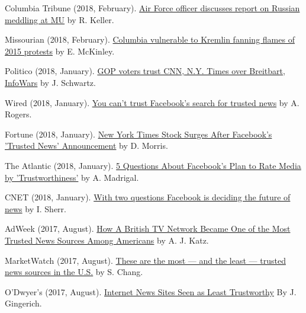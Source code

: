 \begin{bibenum}
    \item[] Columbia Tribune (2018, February).
      \href{http://www.columbiatribune.com/news/20180217/air-force-officer-discusses-report-on-russian-meddling-at-mu}{Air Force officer discusses report on Russian meddling at MU} by R. Keller.
    \item[] Missourian (2018, February).
      \href{https://www.columbiamissourian.com/news/higher_education/columbia-vulnerable-to-kremlin-fanning-flames-of-protests/article_929cf366-11ad-11e8-9631-63ac0b4a6fd3.html}{Columbia vulnerable to Kremlin fanning flames of 2015 protests} by E. McKinley.
    \item[] Politico (2018, January).
      \href{https://www.politico.com/amp/story/2018/02/06/gop-republican-voters-media-bias-trusted-sites-393650}{ GOP voters trust CNN, N.Y. Times over Breitbart, InfoWars} by J. Schwartz.
    \item[] Wired (2018, January).
      \href{https://www.wired.com/story/you-cant-trust-facebooks-search-for-trusted-news/}{You can't trust Facebook's search for trusted news} by A. Rogers.
    \item[] Fortune (2018, January).
      \href{http://fortune.com/2018/01/21/new-york-times-stock-facebooks-trusted-news/}{New York Times Stock Surges After Facebook's 'Trusted News' Announcement} by D. Morris.
    \item[] The Atlantic (2018, January).
      \href{https://www.theatlantic.com/technology/archive/2018/01/facebook-media-trustworthiness/551045/}{5 Questions About Facebook's Plan to Rate Media by 'Trustworthiness'} by A. Madrigal.
    \item[] CNET (2018, January).
      \href{https://www.cnet.com/news/with-two-questions-facebook-is-deciding-the-future-of-news-zuckerberg-fake-news/}{With
    two questions Facebook is deciding the future of news} by I. Sherr.
    \item[] AdWeek (2017, August).
      \href{http://www.adweek.com/tvnewser/how-a-british-tv-network-became-one-of-the-most-trusted-news-sources-among-americans/339872}{How A British TV Network Became One of the Most Trusted News Sources Among Americans} by A. J. Katz.
    \item[] MarketWatch (2017, August).
      \href{https://www.marketwatch.com/story/these-are-the-most-and-the-least-trusted-news-sources-in-the-us-2017-08-03}{These are the most — and the least — trusted news sources in the U.S.} by S. Chang.
    \item[] O'Dwyer's (2017, August).
      \href{http://www.odwyerpr.com/story/public/9210/2017-08-08/internet-news-sites-seen-as-least-trustworthy.html}{Internet News Sites Seen as Least Trustworthy} By J. Gingerich.

\end{bibenum}
